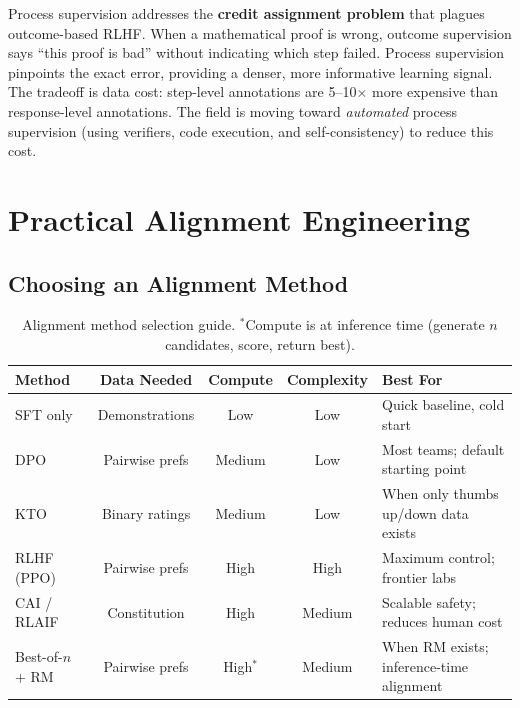 \begin{keyinsight}
Process supervision addresses the \textbf{credit assignment problem} that
plagues outcome-based RLHF.  When a mathematical proof is wrong, outcome
supervision says ``this proof is bad'' without indicating which step
failed.  Process supervision pinpoints the exact error, providing a
denser, more informative learning signal.  The tradeoff is data cost:
step-level annotations are 5--10$\times$ more expensive than response-level
annotations.  The field is moving toward \emph{automated} process
supervision (using verifiers, code execution, and self-consistency) to
reduce this cost.
\end{keyinsight}


\section{Practical Alignment Engineering}
\label{sec:practical_alignment}

\subsection{Choosing an Alignment Method}

\begin{table}[H]
\centering
\small
\begin{tabularx}{\textwidth}{@{}l c c c X@{}}
\toprule
\textbf{Method} & \textbf{Data Needed} & \textbf{Compute} & \textbf{Complexity} & \textbf{Best For} \\
\midrule
SFT only         & Demonstrations & Low    & Low    & Quick baseline, cold start \\
DPO              & Pairwise prefs & Medium & Low    & Most teams; default starting point \\
KTO              & Binary ratings & Medium & Low    & When only thumbs up/down data exists \\
RLHF (PPO)       & Pairwise prefs & High   & High   & Maximum control; frontier labs \\
CAI / RLAIF      & Constitution   & High   & Medium & Scalable safety; reduces human cost \\
Best-of-$n$ + RM & Pairwise prefs & High$^*$ & Medium & When RM exists; inference-time alignment \\
\bottomrule
\end{tabularx}
\caption{Alignment method selection guide.  $^*$Compute is at inference
time (generate $n$ candidates, score, return best).}
\label{tab:alignment_choice}
\end{table}

